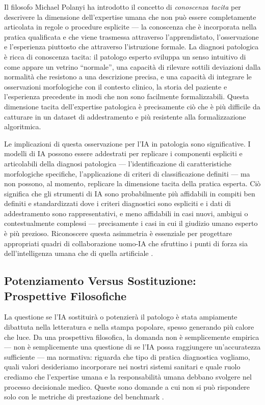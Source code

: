 Il filosofo Michael Polanyi ha introdotto il concetto di \emph{conoscenza tacita} per descrivere la dimensione dell'expertise umana che non può essere completamente articolata in regole o procedure esplicite — la conoscenza che è incorporata nella pratica qualificata e che viene trasmessa attraverso l'apprendistato, l'osservazione e l'esperienza piuttosto che attraverso l'istruzione formale. La diagnosi patologica è ricca di conoscenza tacita: il patologo esperto sviluppa un senso intuitivo di come appare un vetrino ``normale'', una capacità di rilevare sottili deviazioni dalla normalità che resistono a una descrizione precisa, e una capacità di integrare le osservazioni morfologiche con il contesto clinico, la storia del paziente e l'esperienza precedente in modi che non sono facilmente formalizzabili. Questa dimensione tacita dell'expertise patologica è precisamente ciò che è più difficile da catturare in un dataset di addestramento e più resistente alla formalizzazione algoritmica.

Le implicazioni di questa osservazione per l'IA in patologia sono significative. I modelli di IA possono essere addestrati per replicare i componenti espliciti e articolabili della diagnosi patologica — l'identificazione di caratteristiche morfologiche specifiche, l'applicazione di criteri di classificazione definiti — ma non possono, al momento, replicare la dimensione tacita della pratica esperta. Ciò significa che gli strumenti di IA sono probabilmente più affidabili in compiti ben definiti e standardizzati dove i criteri diagnostici sono espliciti e i dati di addestramento sono rappresentativi, e meno affidabili in casi nuovi, ambigui o contestualmente complessi — precisamente i casi in cui il giudizio umano esperto è più prezioso. Riconoscere questa asimmetria è essenziale per progettare appropriati quadri di collaborazione uomo-IA che sfruttino i punti di forza sia dell'intelligenza umana che di quella artificiale \cite{amann2020}.

\subsection{Potenziamento Versus Sostituzione: Prospettive Filosofiche}

La questione se l'IA sostituirà o potenzierà il patologo è stata ampiamente dibattuta nella letteratura e nella stampa popolare, spesso generando più calore che luce. Da una prospettiva filosofica, la domanda non è semplicemente empirica — non è semplicemente una questione di se l'IA possa raggiungere un'accuratezza sufficiente — ma normativa: riguarda che tipo di pratica diagnostica vogliamo, quali valori desideriamo incorporare nei nostri sistemi sanitari e quale ruolo crediamo che l'expertise umana e la responsabilità umana debbano svolgere nel processo decisionale medico. Queste sono domande a cui non si può rispondere solo con le metriche di prestazione del benchmark \cite{hanna2024}.

